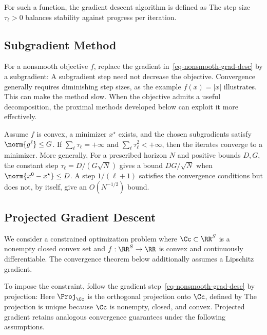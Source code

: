For such a function, the gradient descent algorithm is defined as
The step size $\tau_\ell>0$ balances stability against progress per iteration.


\subsection{Subgradient Method}

For a nonsmooth objective $f$, replace the gradient in~\eqref{eq-nonsmooth-grad-desc} by a subgradient:
A subgradient step need not decrease the objective. Convergence generally requires diminishing step sizes, as the example $f(x)=|x|$ illustrates. This can make the method slow. When the objective admits a useful decomposition, the proximal methods developed below can exploit it more effectively.

\begin{thm}
Assume $f$ is convex, a minimizer $x^\star$ exists, and the chosen subgradients satisfy $\norm{g^\ell}\leq G$. If $\sum_\ell\tau_\ell=+\infty$ and $\sum_\ell\tau_\ell^2<+\infty$, then the iterates converge to a minimizer. More generally,
For a prescribed horizon $N$ and positive bounds $D,G$, the constant step $\tau_\ell=D/(G\sqrt N)$ gives a bound $DG/\sqrt N$ when $\norm{x^0-x^\star}\leq D$. A step $1/(\ell+1)$ satisfies the convergence conditions but does not, by itself, give an $O(N^{-1/2})$ bound.
\end{thm}

\subsection{Projected Gradient Descent}
\label{sec-proj-grad}

We consider a constrained optimization problem
where $\Cc \subset \RR^S$ is a nonempty closed convex set and $f : \RR^S \rightarrow \RR$ is convex and continuously differentiable. The convergence theorem below additionally assumes a Lipschitz gradient.

To impose the constraint, follow the gradient step~\eqref{eq-nonsmooth-grad-desc} by projection:
Here $\Proj_\Cc$ is the orthogonal projection onto $\Cc$, defined by
The projection is unique because $\Cc$ is nonempty, closed, and convex.
%
Projected gradient retains analogous convergence guarantees under the following assumptions.


